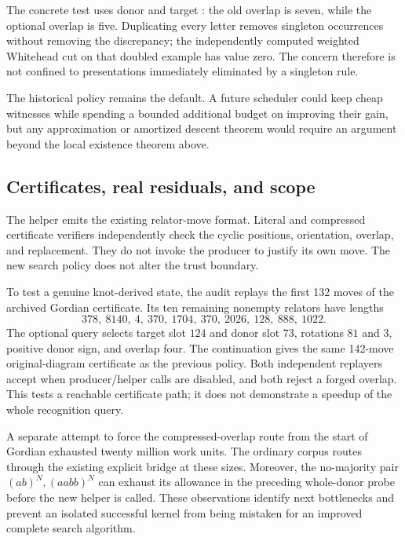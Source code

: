 The concrete test uses donor  and target
: the old overlap is seven, while the optional overlap
is five. Duplicating every letter removes singleton occurrences without
removing the discrepancy; the independently computed weighted Whitehead
cut on that doubled example has value zero. The concern therefore is not
confined to presentations immediately eliminated by a singleton rule.

The historical policy remains the default. A future scheduler could keep
cheap witnesses while spending a bounded additional budget on improving
their gain, but any approximation or amortized descent theorem would require
an argument beyond the local existence theorem above.

\subsection{Certificates, real residuals, and scope}

The helper emits the existing relator-move format. Literal and compressed
certificate verifiers independently check the cyclic positions, orientation,
overlap, and replacement. They do not invoke the producer to justify its
own move. The new search policy does not alter the trust boundary.

To test a genuine knot-derived state, the audit replays the first 132 moves
of the archived Gordian certificate. Its ten remaining nonempty relators
have lengths
\[
 378,\ 8140,\ 4,\ 370,\ 1704,\ 370,\ 2026,\ 128,\ 888,\ 1022.
\]
The optional query selects target slot $124$ and donor slot $73$, rotations
$81$ and $3$, positive donor sign, and overlap four. The continuation gives
the same 142-move original-diagram certificate as the previous policy. Both
independent replayers accept when producer/helper calls are disabled, and
both reject a forged overlap. This tests a reachable certificate path; it
does not demonstrate a speedup of the whole recognition query.

A separate attempt to force the compressed-overlap route from the start of
Gordian exhausted twenty million work units. The ordinary corpus routes
through the existing explicit bridge at these sizes. Moreover, the
no-majority pair $(ab)^N,(aabb)^N$ can exhaust its allowance in the preceding
whole-donor probe before the new helper is called. These observations
identify next bottlenecks and prevent an isolated successful kernel from
being mistaken for an improved complete search algorithm.
